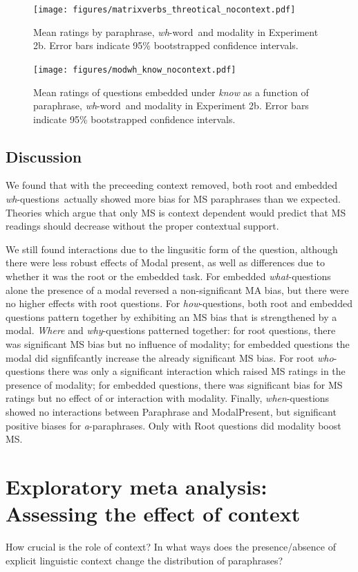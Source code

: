 \documentclass[12pt,letterpaper,table,svgnames,dvipsnames]{article}
\newcommand{\whqs}{\emph{wh}-questions~}
\newcommand{\whw}{\emph{wh}-word~}
\begin{document}
\begin{figure}[h!]
\centering
\texttt{[image: figures/matrixverbs\_threotical\_nocontext.pdf]}
\caption{Mean ratings by paraphrase, \whw and modality in Experiment 2b. Error bars indicate 95\% bootstrapped confidence intervals.} 
\label{ex2b_matrix_verbs}
\end{figure}


\begin{figure}[h!]
\centering
\texttt{[image: figures/modwh\_know\_nocontext.pdf]}
\caption{Mean ratings of questions embedded under \emph{know} as a function of paraphrase, \whw and modality in Experiment 2b. Error bars indicate 95\% bootstrapped confidence intervals.} 
\label{ex2b_know_modXwh}
\end{figure}


\subsection{Discussion}
We found that with the preceeding context removed, both root and embedded \whqs actually showed more bias for MS paraphrases than we expected. Theories which argue that only MS is context dependent would predict that MS readings should decrease without the proper contextual support. 

We still found interactions due to the lingusitic form of the question, although there were less robust effects of Modal present, as well as differences due to whether it was the root or the embedded task. For embedded \emph{what}-questions alone the presence of a modal reversed a non-significant MA bias, but there were no higher effects with root questions. For \emph{how}-questions, both root and embedded questions pattern together by exhibiting an MS bias that is strengthened by a modal. \emph{Where} and \emph{why}-questions patterned together: for root questions, there was significant MS bias but no influence of modality; for embedded questions the modal did signfifcantly increase the already significant MS bias. For root \emph{who}-questions there was only a significant interaction which raised MS ratings in the presence of modality; for embedded questions, there was significant bias for MS ratings but no effect of or interaction with modality. Finally, \emph{when}-questions showed no interactions between Paraphrase and ModalPresent, but significant positive biases for \emph{a}-paraphrases. Only with Root questions did modality boost MS.



\section{Exploratory meta analysis: Assessing the effect of context}
How crucial is the role of context? In what ways does the presence/absence of explicit linguistic context change the distribution of paraphrases? 
\end{document}
